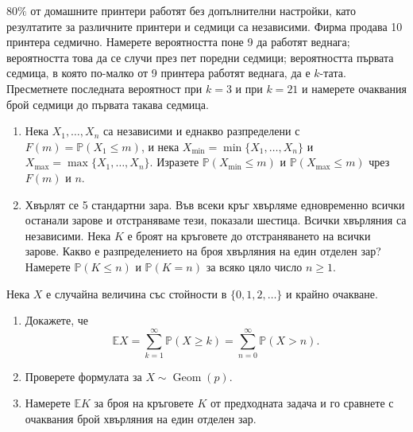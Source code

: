 \documentclass[11pt,a4paper]{article}
\newenvironment{enumeratea}{\begin{enumerate}[label=(\alph*),itemsep=0.28em,topsep=0.25em]}{\end{enumerate}}
\newcommand{\Pbb}{\mathbb P}
\newcommand{\Ebb}{\mathbb E}
\newcommand{\Geom}{\operatorname{Geom}}
\newcounter{problem}[section]
\begin{document}
\begin{problem}
$80\%$ от домашните принтери работят без допълнителни настройки, като
резултатите за различните принтери и седмици са независими. Фирма продава
10 принтера седмично. Намерете вероятността поне 9 да работят веднага;
вероятността това да се случи през пет поредни седмици; вероятността първата
седмица, в която по-малко от 9 принтера работят веднага, да е $k$-тата.
Пресметнете последната вероятност при $k=3$ и при $k=21$ и намерете
очаквания брой седмици до първата такава седмица.
\end{problem}

\begin{problempencil}[К1, СЕМ 2023]
\begin{enumeratea}
  \item Нека $X_1,\dots,X_n$ са независими и еднакво разпределени с
  $F(m)=\Pbb(X_1\le m)$, и нека $X_{\min}=\min\{X_1,\dots,X_n\}$ и
  $X_{\max}=\max\{X_1,\dots,X_n\}$. Изразете
  $\Pbb(X_{\min}\le m)$ и $\Pbb(X_{\max}\le m)$ чрез $F(m)$ и $n$.
  \item Хвърлят се 5 стандартни зара. Във всеки кръг хвърляме едновременно
  всички останали зарове и отстраняваме тези, показали шестица.
  Всички хвърляния са независими. Нека $K$ е броят на кръговете до
  отстраняването на всички зарове. Какво е разпределението на броя
  хвърляния на един отделен зар? Намерете $\Pbb(K\le n)$ и $\Pbb(K=n)$
  за всяко цяло число $n\ge1$.
\end{enumeratea}
\end{problempencil}

\begin{problem}
Нека $X$ е случайна величина със стойности в $\{0,1,2,\dots\}$ и крайно
очакване.
\begin{enumeratea}
  \item Докажете, че
  \[
  \Ebb X=\sum_{k=1}^\infty\Pbb(X\ge k)=\sum_{n=0}^\infty\Pbb(X>n).
  \]
  \item Проверете формулата за $X\sim\Geom(p)$.
  \item Намерете $\Ebb K$ за броя на кръговете $K$ от предходната задача и
  го сравнете с очаквания брой хвърляния на един отделен зар.
\end{enumeratea}
\end{problem}
\end{document}
